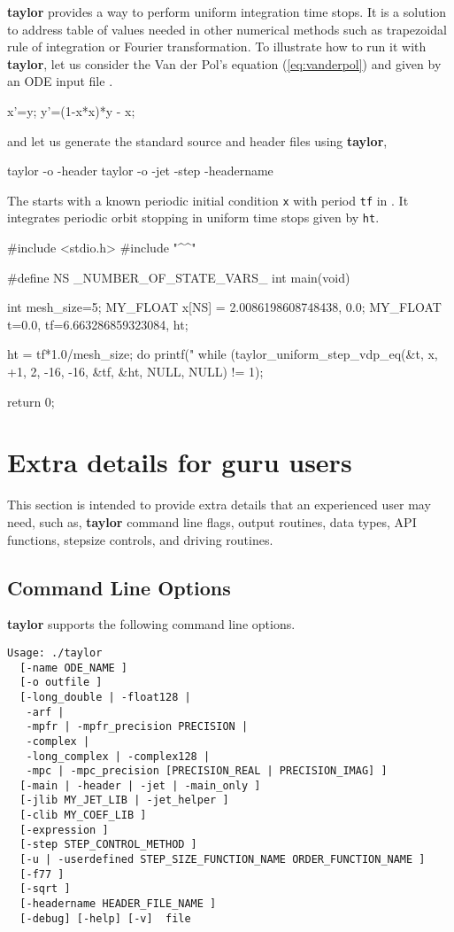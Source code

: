 \documentclass[10pt]{article}
\theoremstyle{remark}
\newcommand{\taylorname}{{\bf taylor}}
\newcommand{\inputfile}{}
\newcommand{\mainfile}{}
\newcommand{\odecfile}{}
\newcommand{\odehfile}{}
\begin{document}
\taylorname{} provides a way to perform uniform integration time
stops. It is a solution to address table of values needed in other
numerical methods such as trapezoidal rule of integration or Fourier
transformation. To illustrate how to run it with \taylorname{}, let us
consider the Van der Pol's equation (\ref{eq:vanderpol}) and given by
an ODE input file \inputfile{}.
\begin{code}[title={File: \inputfile{}}]
    x'=y;
    y'=(1-x*x)*y - x;
\end{code}
and let us generate the standard source and header files using \taylorname{},
\begin{command}
    taylor -o \odehfile{} -header \inputfile{}
    taylor -o \odecfile{} -jet -step -headername \odehfile{} \inputfile{}
\end{command}
The \mainfile{} starts with a known periodic initial condition
\verb+x+ with period \verb+tf+ in \mainfile{}. It integrates periodic
orbit stopping in uniform time stops given by \verb+ht+.
\begin{code}[title={File: \mainfile{}}]
    #include <stdio.h>
    #include "^\odehfile{}^"

    #define NS _NUMBER_OF_STATE_VARS_
    int main(void)
    {
      int mesh_size=5;
      MY_FLOAT x[NS] = {2.0086198608748438, 0.0};
      MY_FLOAT t=0.0, tf=6.663286859323084, ht;
    
      ht = tf*1.0/mesh_size;
      do {
          printf("%
      } while (taylor_uniform_step_vdp_eq(&t, x, +1, 2, -16, -16, &tf, &ht, NULL, NULL) != 1);
    
      return 0;
    }
\end{code}

\section{Extra details for guru users} \label{sec:advanced}
This section is intended to provide extra details that an experienced
user may need, such as, \taylorname{} command line flags, output
routines, data types, API functions, stepsize controls, and driving
routines.


\subsection{Command Line Options}\label{sec:clo}

\taylorname{} supports the following command line options.
\begin{verbatim}
Usage: ./taylor 
  [-name ODE_NAME ]
  [-o outfile ]
  [-long_double | -float128 |
   -arf |
   -mpfr | -mpfr_precision PRECISION |
   -complex |
   -long_complex | -complex128 |
   -mpc | -mpc_precision [PRECISION_REAL | PRECISION_IMAG] ]
  [-main | -header | -jet | -main_only ]
  [-jlib MY_JET_LIB | -jet_helper ]
  [-clib MY_COEF_LIB ]
  [-expression ]
  [-step STEP_CONTROL_METHOD ]
  [-u | -userdefined STEP_SIZE_FUNCTION_NAME ORDER_FUNCTION_NAME ]
  [-f77 ]
  [-sqrt ]
  [-headername HEADER_FILE_NAME ]
  [-debug] [-help] [-v]  file
\end{verbatim}
\end{document}
